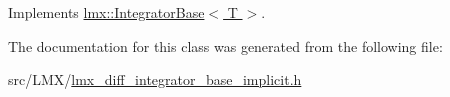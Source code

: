 Implements \hyperlink{classlmx_1_1IntegratorBase_a78adaaa37562ad47226ee2192fd44bd0}{lmx\-::\-Integrator\-Base$<$ T $>$}.



The documentation for this class was generated from the following file\-:\begin{DoxyCompactItemize}
\item 
src/\-L\-M\-X/\hyperlink{lmx__diff__integrator__base__implicit_8h}{lmx\-\_\-diff\-\_\-integrator\-\_\-base\-\_\-implicit.\-h}\end{DoxyCompactItemize}
